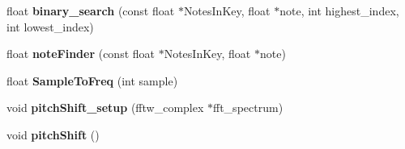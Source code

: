 \begin{DoxyCompactItemize}
\item 
\hypertarget{classvocoder_a7a0b1f788e03878de287d7f6163208a9}{float {\bfseries binary\-\_\-search} (const float $\ast$Notes\-In\-Key, float $\ast$note, int highest\-\_\-index, int lowest\-\_\-index)}\label{classvocoder_a7a0b1f788e03878de287d7f6163208a9}

\item 
\hypertarget{classvocoder_afb731a113935c575939ebdff7ae37580}{float {\bfseries note\-Finder} (const float $\ast$Notes\-In\-Key, float $\ast$note)}\label{classvocoder_afb731a113935c575939ebdff7ae37580}

\item 
\hypertarget{classvocoder_a2b3a6e386d3a18f9366320e5743d33b1}{float {\bfseries Sample\-To\-Freq} (int sample)}\label{classvocoder_a2b3a6e386d3a18f9366320e5743d33b1}

\item 
\hypertarget{classvocoder_aa3d122aee6d6ae77ac5b04572e924dc0}{void {\bfseries pitch\-Shift\-\_\-setup} (fftw\-\_\-complex $\ast$fft\-\_\-spectrum)}\label{classvocoder_aa3d122aee6d6ae77ac5b04572e924dc0}

\item 
\hypertarget{classvocoder_aa218678a51da7429066c32e59edd5057}{void {\bfseries pitch\-Shift} ()}\label{classvocoder_aa218678a51da7429066c32e59edd5057}

\end{DoxyCompactItemize}
